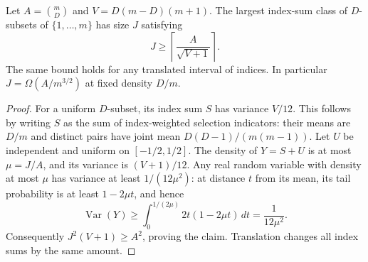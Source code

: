 \begin{lemma}\label{tou:concentration}
Let $A=\binom mD$ and $V=D(m-D)(m+1)$.
The largest index-sum class of $D$-subsets of
$\{1,\ldots,m\}$ has size $J$ satisfying
\[
 J\ge \left\lceil\frac{A}{\sqrt{V+1}}\right\rceil.
\]
The same bound holds for any translated interval of indices.
In particular $J=\Omega(A/m^{3/2})$ at fixed density $D/m$.
\end{lemma}
\begin{proof}
For a uniform $D$-subset, its index sum $S$ has variance $V/12$.
This follows by writing $S$ as the sum of index-weighted selection
indicators: their means are $D/m$ and distinct pairs have joint mean
$D(D-1)/(m(m-1))$.
Let $U$ be independent and uniform on $[-1/2,1/2]$.
The density of $Y=S+U$ is at most $\mu=J/A$, and its variance is
$(V+1)/12$. Any real random variable with density at most $\mu$
has variance at least $1/(12\mu^2)$: at distance $t$ from its mean,
its tail probability is at least $1-2\mu t$, and hence
\[
 \operatorname{Var}(Y)\ge
 \int_0^{1/(2\mu)}2t(1-2\mu t)\,dt=\frac1{12\mu^2}.
\]
Consequently $J^2(V+1)\ge A^2$, proving the claim.
Translation changes all index sums by the same amount.
\end{proof}
